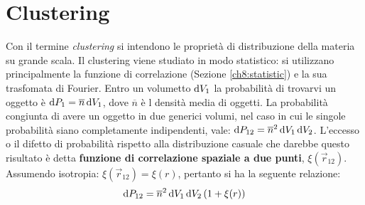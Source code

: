 \chapter{Clustering}\label{10:ch}
Con il termine \textit{clustering} si intendono le proprietà di distribuzione della materia su grande scala. Il clustering viene studiato in modo statistico: si utilizzano principalmente la funzione di correlazione (Sezione \ref{ch8:statistic}) e la sua trasfomata di Fourier. Entro un volumetto $\operatorname{d}\!{V_1}$ la probabilità di trovarvi un oggetto è $\operatorname{d}\!{P_1}=\overline{n}\operatorname{d}\!{V_1}$, dove $\overline{n}$ è l densità media di oggetti. La probabilità congiunta di avere un oggetto in due generici volumi, nel caso in cui le singole probabilità siano completamente indipendenti, vale: $\operatorname{d}\!{P}_{12}=\overline{n}^2 \operatorname{d}\!{V_1}\operatorname{d}\!{V_2}$. L'eccesso o il difetto di probabilità rispetto alla distribuzione casuale che darebbe questo risultato è detta \textbf{funzione di correlazione spaziale a due punti}, $\xi(\vec{r}_{12})$. Assumendo isotropia: $\xi(\vec{r}_{12})=\xi(r)$, pertanto si ha la seguente relazione: 
\begin{equation}
    \operatorname{d}\!{P}_{12}=\overline{n}^2 \operatorname{d}\!{V_1}\operatorname{d}\!{V_2} \left(1+\xi(r)\right)
\end{equation}

